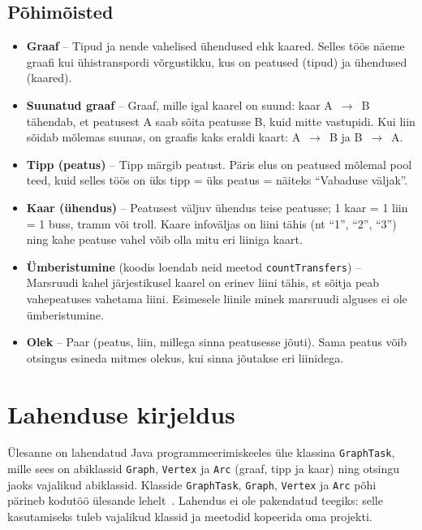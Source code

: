 \documentclass[12pt,a4paper,oneside]{report}
\newcommand{\code}[1]{\texttt{#1}}
\theoremstyle{definition}
\theoremstyle{plain}
\begin{document}
\section{Põhimõisted}
\label{sec:moisted}

\begin{itemize}
  \item \textbf{Graaf} -- Tipud ja nende vahelised ühendused ehk kaared. Selles töös näeme graafi kui ühistranspordi võrgustikku, kus on peatused (tipud) ja ühendused (kaared).
  \item \textbf{Suunatud graaf} -- Graaf, mille igal kaarel on suund: kaar A~$\to$~B tähendab, et peatusest A saab sõita peatusse B, kuid mitte vastupidi. Kui liin sõidab mõlemas suunas, on graafis kaks eraldi kaart: A~$\to$~B ja B~$\to$~A.
  \item \textbf{Tipp (peatus)} -- Tipp märgib peatust. Päris elus on peatused mõlemal pool teed, kuid selles töös on üks tipp = üks peatus = näiteks ``Vabaduse väljak''.
  \item \textbf{Kaar (ühendus)} -- Peatusest väljuv ühendus teise peatusse; 1 kaar = 1 liin = 1 buss, tramm või troll. Kaare infoväljas on liini tähis (nt ``1'', ``2'', ``3'') ning kahe peatuse vahel võib olla mitu eri liiniga kaart.
  \item \textbf{Ümberistumine} (koodis loendab neid meetod \code{countTransfers}) -- Marsruudi kahel järjestikusel kaarel on erinev liini tähis, st sõitja peab vahepeatuses vahetama liini. Esimesele liinile minek marsruudi alguses ei ole ümberistumine.
  \item \textbf{Olek} -- Paar (peatus, liin, millega sinna peatusesse jõuti). Sama peatus võib otsingus esineda mitmes olekus, kui sinna jõutakse eri liinidega.
\end{itemize}

\chapter{Lahenduse kirjeldus}
\label{ch:lahendus}

Ülesanne on lahendatud Java programmeerimiskeeles ühe klassina
\code{GraphTask}, mille sees on abiklassid \code{Graph}, \code{Vertex} ja
\code{Arc} (graaf, tipp ja kaar) ning otsingu jaoks vajalikud abiklassid.
Klasside \code{GraphTask}, \code{Graph}, \code{Vertex} ja \code{Arc}
põhi pärineb kodutöö ülesande lehelt~\cite{kodutoo6}.
Lahendus ei ole pakendatud teegiks: selle kasutamiseks tuleb vajalikud
klassid ja meetodid kopeerida oma projekti.
\end{document}
